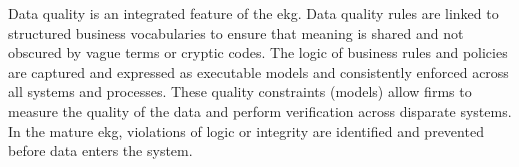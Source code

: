 %
%
Data quality is an integrated feature of the \gls{ekg}.
Data quality rules are linked to structured business vocabularies to ensure that meaning
is shared and not obscured by vague terms or cryptic codes.
The logic of business rules and policies are captured and expressed as executable models and consistently
enforced across all systems and processes.
These quality constraints (models) allow firms to measure the quality of the data and perform verification across
disparate systems.
In the mature \gls{ekg}, violations of logic or integrity are identified and prevented before data
enters the system.
